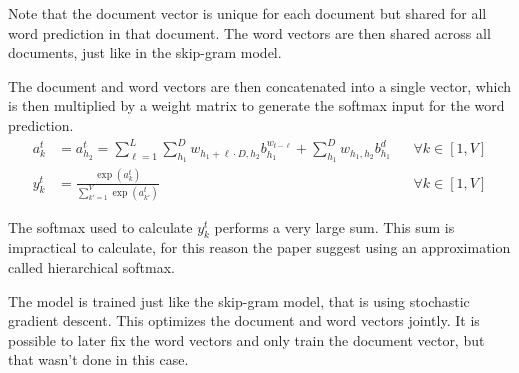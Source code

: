 Note that the document vector is unique for each document but shared for all word prediction in that document. The word vectors are then shared across all documents, just like in the skip-gram model.

The document and word vectors are then concatenated into a single vector, which is then multiplied by a weight matrix to generate the softmax input for the word prediction.
\begin{equation}
\begin{aligned}
a_{k}^t &= a_{h_2}^t = \sum_{\ell=1}^L \sum_{h_1}^D w_{h_1 + \ell \cdot D, h_2} b_{h_1}^{w_{t - \ell}} + \sum_{h_1}^D w_{h_1, h_2} b_{h_1}^d && \forall k \in [1, V] \\
y_{k}^t &= \frac{\exp(a_k^t)}{\sum_{k'=1}^V \exp(a_{k'}^t)} && \forall k \in [1, V]
\end{aligned}
\end{equation}

The softmax used to calculate $y_{k}^t$ performs a very large sum. This sum is impractical to calculate, for this reason the paper \cite{doc2vec} suggest using an approximation called hierarchical softmax.

The model is trained just like the skip-gram model, that is using stochastic gradient descent. This optimizes the document and word vectors jointly. It is possible to later fix the word vectors and only train the document vector, but that wasn't done in this case.
